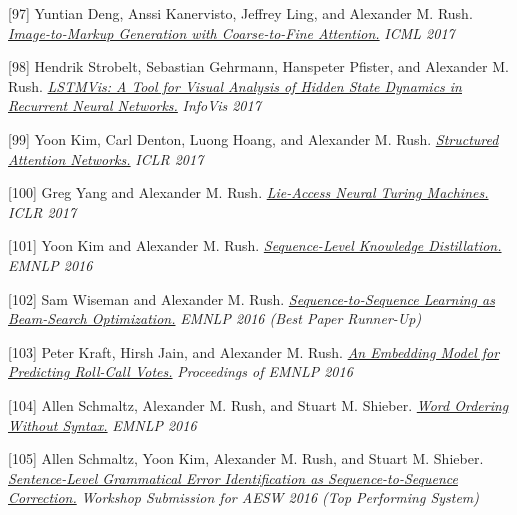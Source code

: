 \documentclass[10pt]{article}
\begin{document}
\medskip


[97] \ind Yuntian Deng, Anssi Kanervisto, Jeffrey Ling, and Alexander M. Rush. \emph{\href{ http://lstm.seas.harvard.edu/latex/ }{ Image-to-Markup Generation with Coarse-to-Fine Attention.} }\emph{ ICML 2017 }

\medskip


[98] \ind Hendrik Strobelt, Sebastian Gehrmann, Hanspeter Pfister, and Alexander M. Rush. \emph{\href{ http://lstm.seas.harvard.edu/ }{ LSTMVis: A Tool for Visual Analysis of Hidden State Dynamics in Recurrent Neural Networks.} }\emph{ InfoVis 2017 }

\medskip


[99] \ind Yoon Kim, Carl Denton, Luong Hoang, and Alexander M. Rush. \emph{\href{ https://arxiv.org/abs/1702.00887 }{ Structured Attention Networks.} }\emph{ ICLR 2017 }

\medskip


[100] \ind Greg Yang and Alexander M. Rush. \emph{\href{ http://lstm.seas.harvard.edu/lantm/ }{ Lie-Access Neural Turing Machines.} }\emph{ ICLR 2017 }

\medskip


[101] \ind Yoon Kim and Alexander M. Rush. \emph{\href{ http://arxiv.org/pdf/1606.07947v1.pdf }{ Sequence-Level Knowledge Distillation.} }\emph{ EMNLP 2016 }

\medskip


[102] \ind Sam Wiseman and Alexander M. Rush. \emph{\href{ http://arxiv.org/pdf/1606.02960.pdf }{ Sequence-to-Sequence Learning as Beam-Search Optimization.} }\emph{ EMNLP 2016 (Best Paper Runner-Up) }

\medskip


[103] \ind Peter Kraft, Hirsh Jain, and Alexander M. Rush. \emph{\href{ https://www.aclweb.org/anthology/D/D16/D16-1221.pdf }{ An Embedding Model for Predicting Roll-Call Votes.} }\emph{ Proceedings of EMNLP 2016 }

\medskip


[104] \ind Allen Schmaltz, Alexander M. Rush, and Stuart M. Shieber. \emph{\href{ https://arxiv.org/abs/1604.08633 }{ Word Ordering Without Syntax.} }\emph{ EMNLP 2016 }

\medskip


[105] \ind Allen Schmaltz, Yoon Kim, Alexander M. Rush, and Stuart M. Shieber. \emph{\href{ /papers/aesw2016.pdf }{ Sentence-Level Grammatical Error Identification as Sequence-to-Sequence Correction.} }\emph{ Workshop Submission for AESW 2016 (Top Performing System) }
\end{document}
